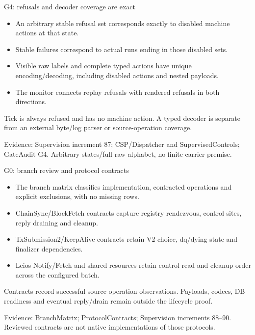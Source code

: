\documentclass[11pt,aspectratio=169]{beamer}
\newcommand{\evidence}[1]{\vfill{\fontsize{7}{8}\selectfont\color{Muted}Evidence: #1\par}}
\begin{document}
\begin{frame}{G4: refusals and decoder coverage are exact}
\begin{itemize}\setlength\itemsep{2.5mm}
\item An arbitrary stable refusal set corresponds exactly to disabled machine actions at that state.
\item Stable failures correspond to actual runs ending in those disabled sets.
\item Visible raw labels and complete typed actions have unique encoding/decoding, including disabled actions and nested payloads.
\item The monitor connects replay refusals with rendered refusals in both directions.
\end{itemize}\small Tick is always refused and has no machine action. A typed decoder is separate from an external byte/log parser or source-operation coverage.
\evidence{Supervision increment 87; CSP/Dispatcher and SupervisedControls; GateAudit G4. Arbitrary states/full raw alphabet, no finite-carrier premise.}
\end{frame}

\begin{frame}{G0: branch review and protocol contracts}
\begin{itemize}\setlength\itemsep{2.5mm}
\item The branch matrix classifies implementation, contracted operations and explicit exclusions, with no missing rows.
\item ChainSync/BlockFetch contracts capture registry rendezvous, control sites, reply draining and cleanup.
\item TxSubmission2/KeepAlive contracts retain V2 choice, dq/dying state and finalizer dependencies.
\item Leios Notify/Fetch and shared resources retain control-read and cleanup order across the configured batch.
\end{itemize}\small Contracts record successful source-operation observations. Payloads, codecs, DB readiness and eventual reply/drain remain outside the lifecycle proof.
\evidence{BranchMatrix; ProtocolContracts; Supervision increments 88--90. Reviewed contracts are not native implementations of those protocols.}
\end{frame}
\end{document}

